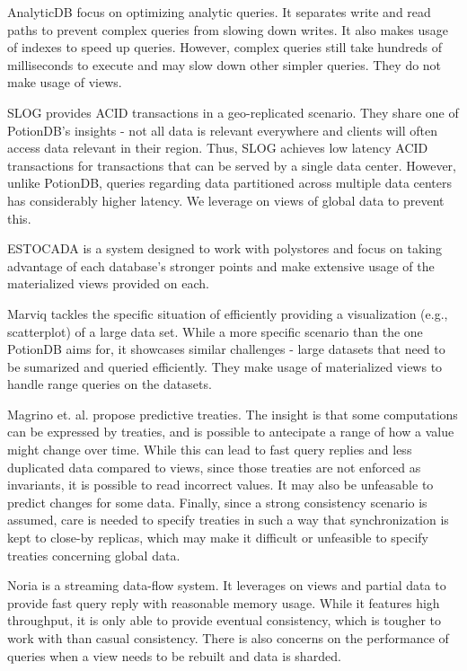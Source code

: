 \documentclass{vldb}
\begin{document}
AnalyticDB \cite{analyticdb} focus on optimizing analytic queries. 
It separates write and read paths to prevent complex queries from slowing down writes. 
It also makes usage of indexes to speed up queries.
However, complex queries still take hundreds of milliseconds to execute and may slow down other simpler queries.
They do not make usage of views.

SLOG \cite{slog} provides ACID transactions in a geo-replicated scenario.
They share one of PotionDB's insights - not all data is relevant everywhere and clients will often access data relevant in their region.
Thus, SLOG achieves low latency ACID transactions for transactions that can be served by a single data center.
However, unlike PotionDB, queries regarding data partitioned across multiple data centers has considerably higher latency.
We leverage on views of global data to prevent this.

ESTOCADA \cite{estocada} is a system designed to work with polystores and focus on taking advantage of each database's stronger points and make extensive usage of the materialized views provided on each.

Marviq \cite{marviq} tackles the specific situation of efficiently providing a visualization (e.g., scatterplot) of a large data set.
While a more specific scenario than the one PotionDB aims for, it showcases similar challenges - large datasets that need to be sumarized and queried efficiently.
They make usage of materialized views to handle range queries on the datasets.

Magrino et. al. \cite{treaties} propose predictive treaties. 
The insight is that some computations can be expressed by treaties, and is possible to antecipate a range of how a value might change over time.
While this can lead to fast query replies and less duplicated data compared to views, since those treaties are not enforced as invariants, it is possible to read incorrect values.
It may also be unfeasable to predict changes for some data.
Finally, since a strong consistency scenario is assumed, care is needed to specify treaties in such a way that synchronization is kept to close-by replicas, which may make it difficult or unfeasible to specify treaties concerning global data.

Noria \cite{noria} is a streaming data-flow system. 
It leverages on views and partial data to provide fast query reply with reasonable memory usage.
While it features high throughput, it is only able to provide eventual consistency, which is tougher to work with than casual consistency.
There is also concerns on the performance of queries when a view needs to be rebuilt and data is sharded.
\end{document}
